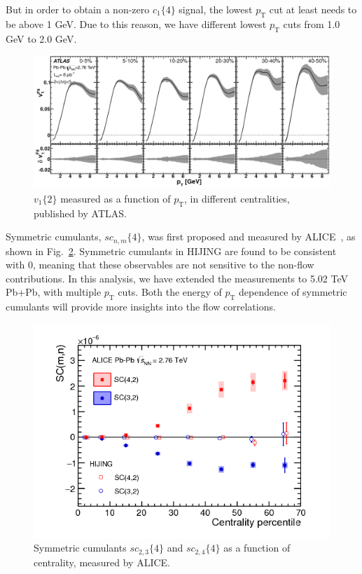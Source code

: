 But in order to obtain a non-zero $c_1\{4\}$ signal, the lowest $p_\text{T}$ cut at least needs to be above 1 GeV. Due to this reason, we have different lowest $p_\text{T}$ cuts from 1.0 GeV to 2.0 GeV.
\begin{figure}[H]
\centering
\includegraphics[width=.9\linewidth]{figs/sec_result/v1_pT_ATLAS.png}
\caption{$v_1\{2\}$ measured as a function of $p_\text{T}$, in different centralities, published by ATLAS.}
\label{fig:result_v1_pT_ATLAS}
\end{figure}

Symmetric cumulants, $sc_{n,m}\{4\}$, was first proposed and measured by ALICE~\cite{ALICE:2016kpq}, as shown in Fig.~\ref{fig:result_sc_ALICE}. Symmetric cumulants in HIJING are found to be consistent with 0, meaning that these observables are not sensitive to the non-flow contributions. In this analysis, we have extended the measurements to 5.02 TeV Pb+Pb, with multiple $p_\text{T}$ cuts. Both the energy of $p_\text{T}$ dependence of symmetric cumulants will provide more insights into the flow correlations.
\begin{figure}[H]
\centering
\includegraphics[width=.5\linewidth]{figs/sec_result/sc_ALICE.png}
\caption{Symmetric cumulants $sc_{2,3}\{4\}$ and $sc_{2,4}\{4\}$ as a function of centrality, measured by ALICE.}
\label{fig:result_sc_ALICE}
\end{figure}

